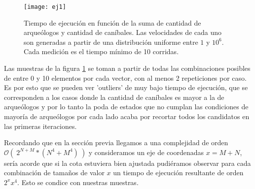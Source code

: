 \begin{figure}[H]
    \centering
    \texttt{[image: ej1]}
    \caption{Tiempo de ejecución en función de la suma de cantidad de arqueólogos y cantidad de caníbales. Las velocidades de cada uno son generadas a partir de una distribución uniforme entre $1$ y $10^6$. Cada medición es el tiempo mínimo de 10 corridas.}
    \label{fig:ej1-fig}
\end{figure}

Las muestras de la figura \ref{fig:ej1-fig} se toman a partir de todas las combinaciones posibles de entre 0 y 10 elementos por cada vector, con al menos 2 repeticiones por caso. Es por esto que se pueden ver 'outliers' de muy bajo tiempo de ejecución, que se corresponden a los casos donde la cantidad de caníbales es mayor a la de arqueólogos y por lo tanto la poda de estados que no cumplan las condiciones de mayoría de arqueólogos por cada lado acaba por recortar todos los candidatos en las primeras iteraciones. 

Recordando que en la sección previa llegamos a una complejidad de orden $ \mathcal{O}(\ 2^{N+M}*(N^4+M^4)\ )$ y consideramos un eje de coordenadas $x = M + N$, sería acorde que si la cota estuviera bien ajustada pudiéramos observar para cada combinación de tamaños de valor $x$ un tiempo de ejecución resultante de orden $ 2^{x} x^4 $. Esto se condice con nuestras muestras.

